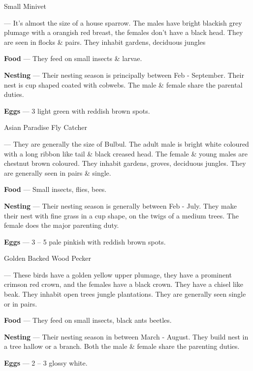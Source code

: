 \begin{bird}{Small Minivet}

 --- It's almost the size of a house sparrow. The males have bright blackish grey plumage with a orangish red breast, the females don't have a black head. They are seen in flocks \& pairs. They inhabit gardens, deciduous jungles

{\large\bf Food} --- They feed on small insects \& larvae.

{\large\bf Nesting} --- Their nesting season is principally between Feb - September. Their nest is cup shaped coated with cobwebs. The male \& female share the parental duties.

{\large\bf Eggs} --- 3 light green with reddish brown spots.
\end{bird}

\newpage

\begin{bird}{Asian Paradise Fly Catcher}

 --- They are generally the size of Bulbul. The adult male is bright white coloured with a long ribbon like tail \& black creased head. The female \& young males are chestnut brown coloured. They inhabit gardens, groves, deciduous jungles. They are generally seen in pairs \& single. 

{\large\bf Food} --- Small insects, flies, bees.

{\large\bf Nesting} --- Their nesting season is generally between Feb - July. They make their nest with fine grass in a cup shape, on the twigs of a medium trees. The female does the major parenting duty.

{\large\bf Eggs} --- 3 -- 5 pale pinkish with reddish brown spots. 
\end{bird}

\begin{bird}{Golden Backed Wood Pecker}

 --- These birds have a golden yellow upper plumage, they have a prominent crimson red crown, and the females have a black crown. They have a chisel like beak. They inhabit open trees jungle plantations. They are generally seen single or in pairs.

{\large\bf Food} --- They feed on small insects, black ants beetles.

{\large\bf Nesting} --- Their nesting season in between March - August. They build nest in a tree hallow or a branch. Both the male \& female share the parenting duties.

{\large\bf Eggs} --- 2 -- 3 glossy white.
\end{bird}

